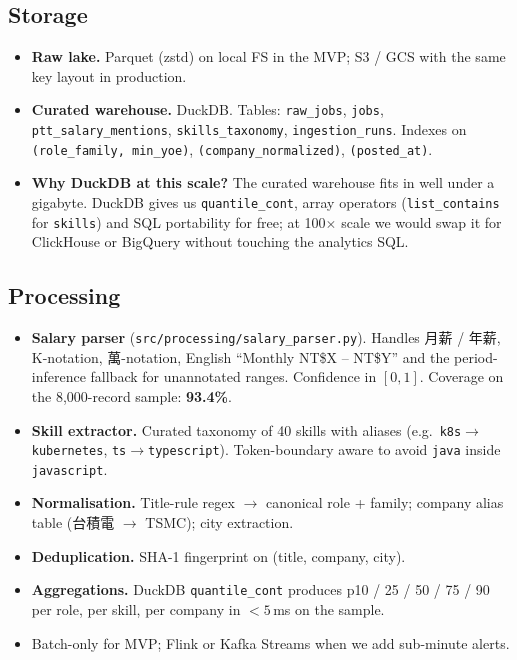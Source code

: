 \documentclass[11pt,a4paper]{article}
\begin{document}
\subsection{Storage}
\begin{itemize}[leftmargin=*,itemsep=0.1em,topsep=0.2em]
  \item \textbf{Raw lake.} Parquet (zstd) on local FS in the MVP; S3 / GCS
    with the same key layout in production.
  \item \textbf{Curated warehouse.} DuckDB. Tables: \texttt{raw\_jobs},
    \texttt{jobs}, \texttt{ptt\_salary\_mentions},
    \texttt{skills\_taxonomy}, \texttt{ingestion\_runs}. Indexes on
    \texttt{(role\_family, min\_yoe)},
    \texttt{(company\_normalized)}, \texttt{(posted\_at)}.
  \item \textbf{Why DuckDB at this scale?} The curated warehouse fits in
    well under a gigabyte. DuckDB gives us \texttt{quantile\_cont}, array
    operators (\texttt{list\_contains} for \texttt{skills}) and SQL
    portability for free; at 100$\times$ scale we would swap it for
    ClickHouse or BigQuery without touching the analytics SQL.
\end{itemize}

\subsection{Processing}
\begin{itemize}[leftmargin=*,itemsep=0.1em,topsep=0.2em]
  \item \textbf{Salary parser} (\texttt{src/processing/salary\_parser.py}).
    Handles 月薪 / 年薪, K-notation, 萬-notation, English ``Monthly NT\$X
    -- NT\$Y'' and the period-inference fallback for unannotated ranges.
    Confidence in $[0, 1]$. Coverage on the 8{,}000-record sample: \textbf{93.4\%}.
  \item \textbf{Skill extractor.} Curated taxonomy of 40 skills with
    aliases (e.g.\ \texttt{k8s}$\to$\texttt{kubernetes},
    \texttt{ts}$\to$\texttt{typescript}). Token-boundary aware to avoid
    \texttt{java} inside \texttt{javascript}.
  \item \textbf{Normalisation.} Title-rule regex $\to$ canonical role
    + family; company alias table (台積電 $\to$ TSMC); city extraction.
  \item \textbf{Deduplication.} SHA-1 fingerprint on
    (title, company, city).
  \item \textbf{Aggregations.} DuckDB \texttt{quantile\_cont} produces
    p10 / 25 / 50 / 75 / 90 per role, per skill, per company in $<5$\,ms
    on the sample.
  \item Batch-only for MVP; Flink or Kafka Streams when we add sub-minute
    alerts.
\end{itemize}
\end{document}
